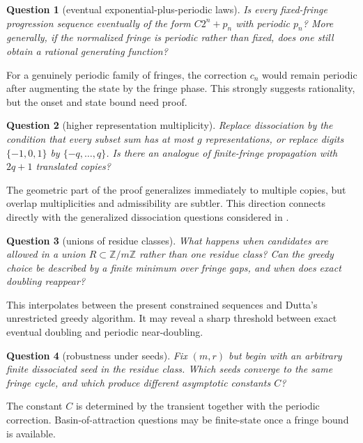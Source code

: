 \documentclass[11pt,a4paper]{article}
\numberwithin{equation}{section}
\theoremstyle{definition}
\theoremstyle{remark}
\theoremstyle{plain}
\newtheorem{question}{Question}
\newcommand{\Z}{\mathbb Z}
\begin{document}
\begin{question}[eventual exponential-plus-periodic laws]\label{gdf:q:laws}
Is every fixed-fringe progression sequence eventually of the form
$C2^n+p_n$ with periodic $p_n$?  More generally, if the normalized fringe is
periodic rather than fixed, does one still obtain a rational generating
function?
\end{question}

For a genuinely periodic family of fringes, the correction $c_n$ would remain
periodic after augmenting the state by the fringe phase.  This strongly
suggests rationality, but the onset and state bound need proof.

\begin{question}[higher representation multiplicity]\label{gdf:q:multiplicity}
Replace dissociation by the condition that every subset sum has at most $g$
representations, or replace digits $\{-1,0,1\}$ by
$\{-q,\dots,q\}$.  Is there an analogue of finite-fringe propagation with
$2q+1$ translated copies?
\end{question}

The geometric part of the proof generalizes immediately to multiple copies,
but overlap multiplicities and admissibility are subtler.  This direction
connects directly with the generalized dissociation questions considered in
\cite{Dutta2026}.

\begin{question}[unions of residue classes]\label{gdf:q:unions}
What happens when candidates are allowed in a union $R\subset\Z/m\Z$ rather
than one residue class?  Can the greedy choice be described by a finite
minimum over fringe gaps, and when does exact doubling reappear?
\end{question}

This interpolates between the present constrained sequences and Dutta's
unrestricted greedy algorithm.  It may reveal a sharp threshold between
exact eventual doubling and periodic near-doubling.

\begin{question}[robustness under seeds]\label{gdf:q:seeds}
Fix $(m,r)$ but begin with an arbitrary finite dissociated seed in the residue
class.  Which seeds converge to the same fringe cycle, and which produce
different asymptotic constants $C$?
\end{question}

The constant $C$ is determined by the transient together with the periodic
correction.  Basin-of-attraction questions may be finite-state once a fringe
bound is available.
\end{document}
